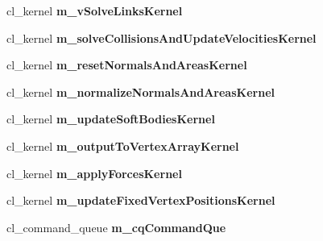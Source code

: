 \begin{DoxyCompactItemize}
\item 
\hypertarget{classbt_open_c_l_soft_body_solver_a2b58707c2479cd5894f836fe1094d77c}{cl\+\_\+kernel {\bfseries m\+\_\+v\+Solve\+Links\+Kernel}}\label{classbt_open_c_l_soft_body_solver_a2b58707c2479cd5894f836fe1094d77c}

\item 
\hypertarget{classbt_open_c_l_soft_body_solver_aedf3e43cbe4e28a346c1f83ee767d2a4}{cl\+\_\+kernel {\bfseries m\+\_\+solve\+Collisions\+And\+Update\+Velocities\+Kernel}}\label{classbt_open_c_l_soft_body_solver_aedf3e43cbe4e28a346c1f83ee767d2a4}

\item 
\hypertarget{classbt_open_c_l_soft_body_solver_af1c66970b310163f31bee7ddbee85b4c}{cl\+\_\+kernel {\bfseries m\+\_\+reset\+Normals\+And\+Areas\+Kernel}}\label{classbt_open_c_l_soft_body_solver_af1c66970b310163f31bee7ddbee85b4c}

\item 
\hypertarget{classbt_open_c_l_soft_body_solver_a3e77381649759ed6d7eeaeef146b771b}{cl\+\_\+kernel {\bfseries m\+\_\+normalize\+Normals\+And\+Areas\+Kernel}}\label{classbt_open_c_l_soft_body_solver_a3e77381649759ed6d7eeaeef146b771b}

\item 
\hypertarget{classbt_open_c_l_soft_body_solver_a0e62f8a3d80c5b2645e0ca3906d976a2}{cl\+\_\+kernel {\bfseries m\+\_\+update\+Soft\+Bodies\+Kernel}}\label{classbt_open_c_l_soft_body_solver_a0e62f8a3d80c5b2645e0ca3906d976a2}

\item 
\hypertarget{classbt_open_c_l_soft_body_solver_ad97303ca23d2f5158f73ae24f6da7dd4}{cl\+\_\+kernel {\bfseries m\+\_\+output\+To\+Vertex\+Array\+Kernel}}\label{classbt_open_c_l_soft_body_solver_ad97303ca23d2f5158f73ae24f6da7dd4}

\item 
\hypertarget{classbt_open_c_l_soft_body_solver_a64c682791e65092cb41424ca4efc7522}{cl\+\_\+kernel {\bfseries m\+\_\+apply\+Forces\+Kernel}}\label{classbt_open_c_l_soft_body_solver_a64c682791e65092cb41424ca4efc7522}

\item 
\hypertarget{classbt_open_c_l_soft_body_solver_a9c1497e925c861f63de3f0eb4b0761dd}{cl\+\_\+kernel {\bfseries m\+\_\+update\+Fixed\+Vertex\+Positions\+Kernel}}\label{classbt_open_c_l_soft_body_solver_a9c1497e925c861f63de3f0eb4b0761dd}

\item 
\hypertarget{classbt_open_c_l_soft_body_solver_af16edee40e9ea1600566f01b5f19e912}{cl\+\_\+command\+\_\+queue {\bfseries m\+\_\+cq\+Command\+Que}}\label{classbt_open_c_l_soft_body_solver_af16edee40e9ea1600566f01b5f19e912}


\end{DoxyCompactItemize}
